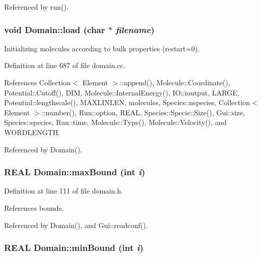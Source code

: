 Referenced by run().\hypertarget{classDomain_8802986198af701f33acaccdedcfa2a2}{
\subsubsection[{load}]{\setlength{\rightskip}{0pt plus 5cm}void Domain::load (char $\ast$ {\em filename})}}
\label{classDomain_8802986198af701f33acaccdedcfa2a2}


Initializing molecules according to bulk properties (restart=0). 



Definition at line 687 of file domain.cc.

References Collection$<$ Element $>$::append(), Molecule::Coordinate(), Potential::Cutoff(), DIM, Molecule::InternalEnergy(), IO::ioutput, LARGE, Potential::lengthscale(), MAXLINLEN, molecules, Species::nspecies, Collection$<$ Element $>$::number(), Run::option, REAL, Species::Specie::Size(), Gui::size, Species::species, Run::time, Molecule::Type(), Molecule::Velocity(), and WORDLENGTH.

Referenced by Domain().\hypertarget{classDomain_35f43f47b82f07881f0dd442263e28df}{
\subsubsection[{maxBound}]{\setlength{\rightskip}{0pt plus 5cm}REAL Domain::maxBound (int {\em i})}}
\label{classDomain_35f43f47b82f07881f0dd442263e28df}




Definition at line 111 of file domain.h.

References bounds.

Referenced by Domain(), and Gui::readconf().\hypertarget{classDomain_80f24f28a5bc6123f6554c01bded983b}{
\subsubsection[{minBound}]{\setlength{\rightskip}{0pt plus 5cm}REAL Domain::minBound (int {\em i})}}
\label{classDomain_80f24f28a5bc6123f6554c01bded983b}




